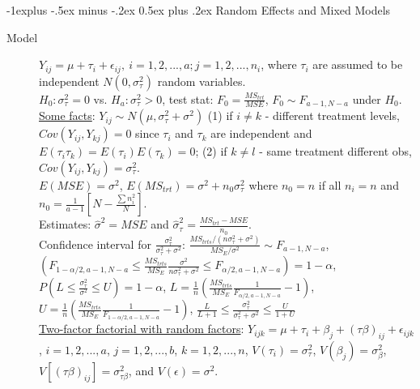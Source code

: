 \documentclass[10pt,landscape]{article}
\makeatletter
\renewcommand{\subsection}{\@startsection{subsection}{2}{0mm}%
                                {-1explus -.5ex minus -.2ex}%
                                {0.5ex plus .2ex}%
                                {\normalfont\normalsize\bfseries}}
\makeatother
\begin{document}
\begin{multicols}{3}

\subsection{Random Effects and Mixed Models}
\begin{description}
\item[Model] $Y_{ij} = \mu + \tau_i + \epsilon_{ij},\ i = 1,2,...,a; j = 1, 2,..., n_i$, where $\tau_i$  are assumed to be independent $N(0, \sigma_{\tau}^2)$ random variables. \\ 
$H_0: \sigma_{\tau}^2 = 0$ vs. $H_a: \sigma_{\tau}^2 > 0$, test stat: $F_0 = \frac{MS_{trt}}{MSE}$, $F_0 \sim F_{a-1,N-a}$ under $H_0$. \\
\underline{Some facts}: $Y_{ij} \sim N(\mu , \sigma_{\tau}^2+\sigma^2)$ (1) if $i\neq k$ - different treatment levels, $Cov(Y_{ij}, Y_{kj}) = 0$ since $\tau_i$ and $\tau_k$ are independent and $E(\tau_i\tau_k) = E(\tau_i)E(\tau_k) = 0$; (2) if $k \neq l$ - same treatment different obs, $Cov(Y_{ij}, Y_{kj}) = \sigma_{\tau}^2$. \\
$E(MSE) = \sigma^2$, $E(MS_{trt}) = \sigma^2 + n_0\sigma_{\tau}^2$ where $n_0 = n$ if all $n_i = n$ and $n_0 = \frac{1}{a-1}[N-\frac{\sum n_i^2}{N}]$.\\
Estimates: $\hat{\sigma}^2 = MSE$ and $\hat{\sigma}_{\tau}^2 = \frac{MS_{trt} - MSE}{n_0}$.\\
Confidence interval for $\frac{\sigma_{\tau}^2}{\sigma_{\tau}^2 + \sigma^2}$: $\frac{MS_{trts} / (n\sigma_{\tau}^2 + \sigma^2)}{MS_E / \sigma^2} \sim F_{a-1,N-a}$, $(F_{1-\alpha/2, a-1, N-a} \leq \frac{MS_{trts}}{MS_E} \frac{\sigma^2}{n\sigma_{\tau}^2 + \sigma^2} \leq F_{\alpha /2, a-1, N-a}) = 1 - \alpha$, $P(L\leq \frac{\sigma_{\tau}^2}{\sigma^2} \leq U) = 1-\alpha$, $L = \frac{1}{n} (\frac{MS_{trts}}{MS_E} \frac{1}{F_{\alpha/2, a-1, N-a}} - 1)$, $U = \frac{1}{n} (\frac{MS_{trts}}{MS_E} \frac{1}{F_{1 - \alpha/2, a-1, N-a}} - 1)$, $\frac{L}{L+1} \leq \frac{\sigma_{\tau}^2}{\sigma_{\tau}^2 + \sigma^2} \leq \frac{U}{1+U}$\\
\underline{Two-factor factorial with random factors}: $Y_{ijk} = \mu + \tau_i + \beta_j + (\tau \beta)_{ij} + \epsilon_{ijk}$,  $i = 1,2,...,a$, $j = 1,2,...,b$, $k = 1,2,...,n$, $V(\tau_i) = \sigma_{\tau}^2$, $V(\beta_j) = \sigma_{\beta}^2$, $V[(\tau \beta)_{ij}] = \sigma_{\tau \beta}^2$, and $V(\epsilon) = \sigma^2$. \\

\end{description}
\end{multicols}
\end{document}
